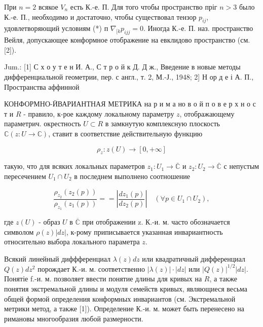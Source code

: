 \documentclass[10pt]{article}
\begin{document}
При $n=2$ всякое $V_{n}$ есть К.-е. П. Для того чтобы пространство пріг $n>3$ было К.-е. П., необходимо и достаточно, чтобы существовал тензор $p_{i j}$, удовлетворяющий условиям (*) п $\nabla_{[k} p_{i j j}=0$. Иногда К.-е. П. наз. пространство Вейля, допускающее конформное отображение на евклидово пространство (см. [2]).



Jum.: [1] С х о у т е н И. А., С т р о й к Д. Д ж., Введение в новые методы дифференциальной геометрии, пер. с англ., т. 2, М.-Ј., 1948; 2] Н ор д е і А. П., Пространства аффинной



КОНФОРМНО-ӤВАРИАНТНАЯ МЕТРИКА на р и м а но в о й п о в е р х н о с т и $R$ - правило, к-рое каждому локальному параметру $z$, отображающему параметрич. окрестность $U \subset R$ в замкнутую комплексную плоскость $\mathbb{C}(z: U \rightarrow \mathbb{C})$, ставит в соответствие действительную функцию



\[

\rho_{z}: z(U) \longrightarrow[0,+\infty]

\]



такую, что для всяких локальных параметров $z_{1}: U_{1} \rightarrow \overline{\mathbb{C}}$ и $z_{2}: U_{2} \rightarrow \overline{\mathbb{C}}$ с непустым пересечением $U_{1} \cap U_{2}$ в последнем выполнено соотношение



\[

\frac{\rho_{z_{2}}\left(z_{2}(p)\right)}{\rho_{z_{1}}\left(z_{1}(p)\right)}==\left|\frac{d z_{1}(p)}{d z_{2}(p)}\right| \quad\left(\forall p \in U_{1} \cap U_{2}\right),

\]



где $z(U)$ - образ $U$ в $\overline{\mathbb{C}}$ при отображении z. К.-и. м. часто обозначается символом $\rho(z)|d z|$, к-рому приписывается указанная инвариантность относительно выбора локального параметра $z$.



Всякий линейный диффференциал $\lambda(z) d z$ или квадратичный дифференциал $Q(z) d z^{2}$ порождает К.-и. м. соответственно $|\lambda(z)| \cdot|d z|$ или $|Q(z)|^{1 / 2}|d z|$. Понятіе f.-и. м. позволяет ввести понятие длины для кривых на $R$, а также понятия экстремальной длины и модуля семейств кривых, являющиеся весьма общей формой определения конформных инвариантов (см. Экстремальной метрики метод, а также [1]). Определение К.-и. м. может быть перенесено на римановы многообразия любой размерности.
\end{document}

